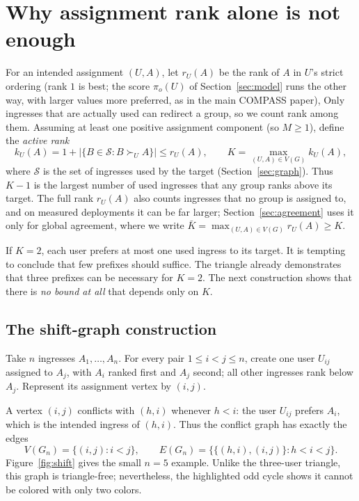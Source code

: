 \documentclass[10pt,a4paper]{article}
\newcommand{\Sset}{\mathcal S}
\begin{document}
\section{Why assignment rank alone is not enough}
\label{sec:rank}

For an intended assignment $(U,A)$, let $r_U(A)$ be the rank of $A$ in $U$'s strict ordering (rank $1$ is best; the score $\pi_o(U)$ of Section~\ref{sec:model} runs the other way, with larger values more preferred, as in the main COMPASS paper), Only ingresses that are actually used can redirect a group, so we count rank among them. Assuming at least one positive assignment component (so $M\ge1$), define the \emph{active rank}
\[
k_U(A)=1+\bigl|\{B\in\Sset:B\succ_U A\}\bigr|\le r_U(A),
\qquad
K=\max_{(U,A)\in V(G)}k_U(A),
\]
where $\Sset$ is the set of ingresses used by the target (Section~\ref{sec:graph}). Thus $K-1$ is the largest number of used ingresses that any group ranks above its target. The full rank $r_U(A)$ also counts ingresses that no group is assigned to, and on measured deployments it can be far larger; Section~\ref{sec:agreement} uses it only for global agreement, where we write $\bar K=\max_{(U,A)\in V(G)}r_U(A)\ge K$.

If $K=2$, each user prefers at most one used ingress to its target. It is tempting to conclude that few prefixes should suffice. The triangle already demonstrates that three prefixes can be necessary for $K=2$. The next construction shows that there is \emph{no bound at all} that depends only on $K$.

\subsection{The shift-graph construction}

Take $n$ ingresses $A_1,\ldots,A_n$. For every pair $1\le i<j\le n$, create one user $U_{ij}$ assigned to $A_j$, with $A_i$ ranked first and $A_j$ second; all other ingresses rank below $A_j$. Represent its assignment vertex by $(i,j)$.

A vertex $(i,j)$ conflicts with $(h,i)$ whenever $h<i$: the user $U_{ij}$ prefers $A_i$, which is the intended ingress of $(h,i)$. Thus the conflict graph has exactly the edges
\begin{equation}\label{eq:shiftedges}
V(G_n)=\{(i,j):i<j\},\qquad
E(G_n)=\bigl\{\{(h,i),(i,j)\}:h<i<j\bigr\}.
\end{equation}
Figure~\ref{fig:shift} gives the small $n=5$ example. Unlike the three-user triangle, this graph is triangle-free; nevertheless, the highlighted odd cycle shows it cannot be colored with only two colors.
\end{document}
